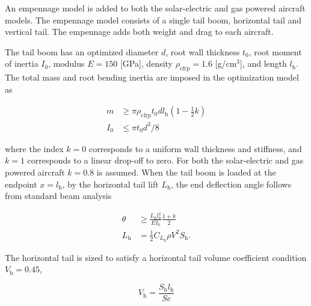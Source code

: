 An empennage model is added to both the solar-electric and gas powered aircraft models.  The empennage model consists of a single tail boom, horizontal tail and vertical tail.  
The empennage adds both weight and drag to each aircraft.  

The tail boom has an optimized diameter $d$, root wall thickness $t_0$, root moment of inertia $I_0$, modulus $E=150$ [GPa]\cite{cfprop}, density $\rho_{\text{cfrp}} = 1.6$ [g/cm$^3$]\cite{cfprop}, and length $l_{\text{h}}$. 
The total mass and root bending inertia are imposed in the optimization model as 

\begin{align}
    m &\geq \pi \rho_{\text{cfrp}} t_0 d l_{\text{h}} \left( 1 - \frac{1}{2} k\right) \\
    I_0 &\leq \pi t_0 d^3/8
\end{align}

where the index $k=0$ corresponds to a uniform wall thickness and stiffness, and $k=1$ corresponds to a linear drop-off to zero.  For both the solar-electric and gas powered aircraft $k=0.8$ is assumed.  
When the tail boom is loaded at the endpoint $x=l_{\text{h}}$, by the horizontal tail lift $L_{\text{h}}$, the end deflection angle follows from standard beam analysis

\begin{align}
    \label{e:boomdefl}
    \theta &\geq \frac{L_{\text{h}} l_{\text{h}}^2}{EI_0} \frac{1+k}{2} \\
    L_{\text{h}} &= \frac{1}{2} C_{L_{\text{h}}} \rho V^2 S_{\text{h}}.
\end{align}

The horizontal tail is sized to satisfy a horizontal tail volume coefficient condition $V_{\text{h}} = 0.45$,\cite{aircraftrules}

\begin{equation}
    V_{\text{h}} = \frac{S_{\text{h}}l_{\text{h}}}{Sc}
\end{equation}

